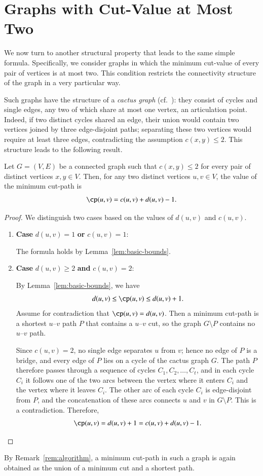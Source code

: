 \section{Graphs with Cut-Value at Most Two}
\label{sec:cut-two}

We now turn to another structural property that leads to the same simple formula.
Specifically, we consider graphs in which the minimum cut-value of every pair of vertices is at most two.
This condition restricts the connectivity structure of the graph in a very particular way.

Such graphs have the structure of a \emph{cactus graph} (cf.~\cite{Mehlhorn2017Certifying}): they consist of cycles and single edges, any two of which share at most one vertex, an articulation point.
Indeed, if two distinct cycles shared an edge, their union would contain two vertices joined by three edge-disjoint paths; separating these two vertices would require at least three edges, contradicting the assumption $c(x,y) \leq 2$.
This structure leads to the following result.

\begin{theorem}
\label{thm:cut-two}
Let $G = (V, E)$ be a connected graph such that $c(x, y) \leq 2$ for every pair of distinct vertices $x, y \in V$.
Then, for any two distinct vertices $u,v \in V$, the value of the minimum cut-path is
\[
\cp(u, v) = c(u, v) + d(u, v) - 1.
\]
\end{theorem}

\begin{proof}
We distinguish two cases based on the values of $d(u, v)$ and $c(u, v)$.

\begin{enumerate}
    \item \textbf{Case} $d(u, v) = 1$ \textbf{or} $c(u, v) = 1$:

    The formula holds by Lemma~\ref{lem:basic-bounds}.

    \item \textbf{Case} $d(u, v) \geq 2$ \textbf{and} $c(u, v) = 2$:

    By Lemma~\ref{lem:basic-bounds}, we have
    \[
    d(u, v) \leq \cp(u, v) \leq d(u, v) + 1.
    \]
    Assume for contradiction that $\cp(u, v) = d(u, v)$.
    Then a minimum cut-path is a shortest $u$--$v$ path $P$ that contains a $u$--$v$ cut, so the graph $G \setminus P$ contains no $u$--$v$ path.

    Since $c(u, v) = 2$, no single edge separates $u$ from $v$; hence no edge of $P$ is a bridge, and every edge of $P$ lies on a cycle of the cactus graph $G$.
    The path $P$ therefore passes through a sequence of cycles $C_1, C_2, \dots, C_t$, and in each cycle $C_i$ it follows one of the two arcs between the vertex where it enters $C_i$ and the vertex where it leaves $C_i$.
    The other arc of each cycle $C_i$ is edge-disjoint from $P$, and the concatenation of these arcs connects $u$ and $v$ in $G \setminus P$.
    This is a contradiction.
    Therefore,
    \[
    \cp(u, v) = d(u, v) + 1 = c(u, v) + d(u, v) - 1. \qedhere
    \]
\end{enumerate}
\end{proof}

By Remark~\ref{rem:algorithm}, a minimum cut-path in such a graph is again obtained as the union of a minimum cut and a shortest path.

